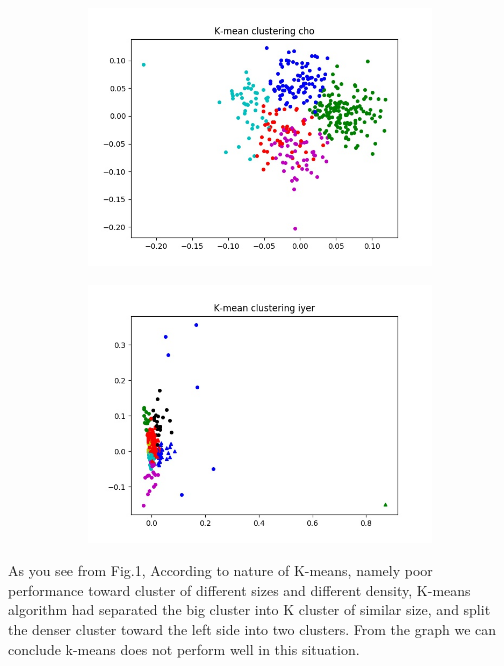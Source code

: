 \documentclass[fleqn]{llncs}
\begin{document}
\begin{figure}
	\centering
	\begin{subfigure}{0.45\textwidth}
		\centering
        \includegraphics[width=\textwidth]{k_meancho.jpg}
		\caption{}
        \label{Fig9_1}
	\end{subfigure}
	\begin{subfigure}{0.45\textwidth}
		\centering
	    \includegraphics[width=\textwidth]{k_meaniyer.jpg}
	    \caption{}
	    \label{Fig9_2}
    \end{subfigure}
\caption{}
\label{fig9}
\end{figure}


As you see from Fig.1, According to nature of K-means, namely poor performance toward cluster of different sizes and different density, K-means algorithm had separated the big cluster into K cluster of similar size, and split the denser cluster toward the left side into two clusters. From the graph we can conclude k-means does not perform well in this situation.
\end{document}
